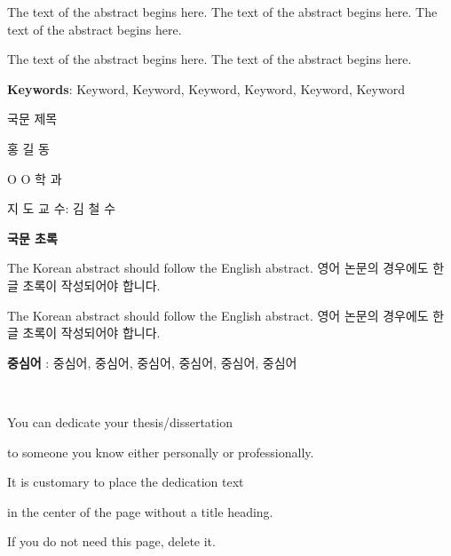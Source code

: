 \documentclass[11pt]{report}
\begin{document}
\normalsize
\justifying %
\doublespacing
The text of the abstract begins here. The text of the abstract begins here. The text of the abstract begins here. \par

The text of the abstract begins here. The text of the abstract begins here.
\par\vspace{20pt}
\textbf{Keywords}: Keyword, Keyword, Keyword, Keyword, Keyword, Keyword


\newpage 
\begin{center}
\LARGE 국문 제목 %
\par\vspace{20pt}
\normalsize 홍 길 동\par %
O O 학 과\par %
지 도 교 수:  김 철 수
\par\vspace{20pt}
\large \textbf{국문 초록}
\end{center}
\normalsize 
The Korean abstract should follow the English abstract.
영어 논문의 경우에도 한글 초록이 작성되어야 합니다. \par
The Korean abstract should follow the English abstract.
영어 논문의 경우에도 한글 초록이 작성되어야 합니다. 
\par \vspace{20pt}
\textbf{중심어} : 중심어, 중심어, 중심어, 중심어, 중심어, 중심어

\newpage
~
\vspace{5.5cm} \par
\begin{center}
You can dedicate your thesis/dissertation  \par 
to someone you know either personally or professionally. \par
It is customary to place the dedication text \par
in the center of the page without a title heading. \par
If you do not need this page, delete it.
\end{center}
\end{document}

